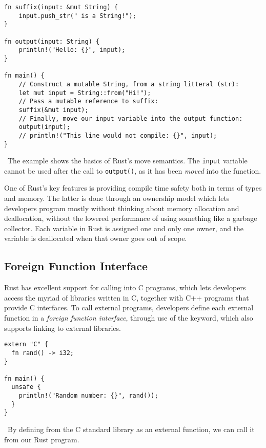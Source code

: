 
\begin{listing}[H]
  \begin{verbatim}
fn suffix(input: &mut String) {
    input.push_str(" is a String!");
}

fn output(input: String) {
    println!("Hello: {}", input);
}

fn main() {
    // Construct a mutable String, from a string litteral (str):
    let mut input = String::from("Hi!");
    // Pass a mutable reference to suffix:
    suffix(&mut input);
    // Finally, move our input variable into the output function:
    output(input);
    // println!("This line would not compile: {}", input);
}
  \end{verbatim}
  \caption{\
    The example shows the basics of Rust's move semantics. The \texttt{input}
    variable cannot be used after the call to \texttt{output()}, as it has been
    \textit{moved} into the function.
  }
\end{listing}

One of Rust’s key features is providing compile time safety both in terms of
types and memory. The latter is done through an ownership model which lets
developers program mostly without thinking about memory allocation and
deallocation, without the lowered performance of using something like a garbage
collector. Each variable in Rust is assigned one and only one owner, and the
variable is deallocated when that owner goes out of scope.


\subsection{Foreign Function Interface}\label{sec:ffi}

Rust has excellent support for calling into C programs, which lets developers
access the myriad of libraries written in C, together with C++ programs that
provide C interfaces. To call external programs, developers define each external
function in a \textit{foreign function
interface}, through
use of the \code{extern} keyword, which also supports linking to external
libraries.

\begin{listing}[H]
  \begin{verbatim}
extern "C" {
  fn rand() -> i32;
}

fn main() {
  unsafe {
    println!("Random number: {}", rand());
  }
}
  \end{verbatim}
  \caption{\
    By defining  from the C standard library as an external function,
    we can call it from our Rust program.
  }\label{lst:extern}
\end{listing}

